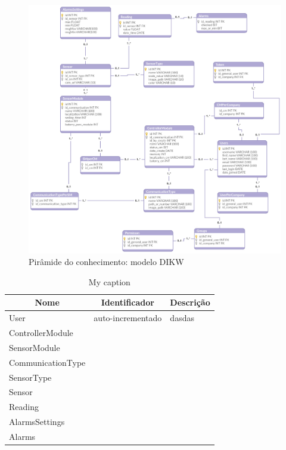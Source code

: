 \begin{figure}[!htb]
	\centering
	\includegraphics[width=\linewidth]{esquemas/database_tese.pdf}
	\caption{Pirâmide do conhecimento: modelo DIKW}
	\label{db}
\end{figure}


\newpage

\begin{table}[h]
	\centering
	\begin{tabular}{|l|l|l|}
		\hline
		\multicolumn{1}{|c|}{\textbf{Nome}} & \multicolumn{1}{c|}{\textbf{Identificador}} & \multicolumn{1}{c|}{\textbf{Descrição}} \\ \hline
		User & auto-incrementado & dasdas \\ \hline
		ControllerModule&  &  \\ \hline
		SensorModule&  &  \\ \hline
		CommunicationType&  &  \\ \hline
		SensorType&  &  \\ \hline
		Sensor&  &  \\ \hline
		Reading&  &  \\ \hline
		AlarmsSettings&  &  \\ \hline
		Alarms&  &  \\ \hline
	\end{tabular}
	\caption{My caption}
	\label{my-label}
\end{table}









